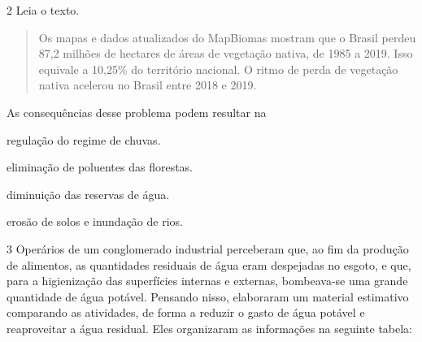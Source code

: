 \num{2} Leia o texto.

\begin{quote}
Os mapas e dados atualizados do MapBiomas mostram que o Brasil perdeu
87,2 milhões de hectares de áreas de vegetação nativa, de 1985 a 2019.
Isso equivale a 10,25\% do território nacional. O ritmo de perda de
vegetação nativa acelerou no Brasil entre 2018 e 2019.

\end{quote}

As consequências desse problema podem resultar na

\begin{minipage}{.5\textwidth}
\begin{escolha}
\item regulação do regime de chuvas.

\item eliminação de poluentes das florestas.

\item diminuição das reservas de água.

\item erosão de solos e inundação de rios.
\end{escolha}
\end{minipage}

\num{3} Operários de um conglomerado industrial perceberam que, ao
fim da produção de alimentos, as quantidades residuais de água eram
despejadas no esgoto, e que, para a higienização das superfícies
internas e externas, bombeava-se uma grande quantidade de água potável.
Pensando nisso, elaboraram um material estimativo comparando as
atividades, de forma a reduzir o gasto de água potável e reaproveitar a
água residual. Eles organizaram as informações na seguinte tabela:\medskip

